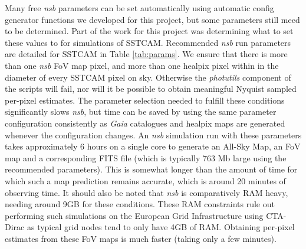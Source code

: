 Many free \textit{nsb} parameters can be set automatically using automatic config generator functions we developed for this project, but some parameters still meed to be determined. Part of the work for this project was determining what to set these values to for simulations of SSTCAM. Recommended \textit{nsb} run parameters are detailed for SSTCAM in Table \ref{tab:params}. We ensure that there is more than one \textit{nsb} FoV map pixel, and more than one healpix pixel within in the diameter of every SSTCAM pixel on sky. Otherwise the \textit{photutils} component of the scripts will fail, nor will it be possible to obtain meaningful Nyquist sampled per-pixel estimates. The parameter selection needed to fulfill these conditions significantly slows \textit{nsb}, but time can be saved by using the same parameter configuration consistently as \textit{Gaia} catalogues and healpix maps are generated whenever the configuration changes. An \textit{nsb} simulation run with these parameters takes approximately 6 hours on a single core to generate an All-Sky Map, an FoV map and a corresponding FITS file (which is typically 763 Mb large using the recommended parameters). This is somewhat longer than the amount of time for which such a map prediction remains accurate, which is around 20 minutes of observing time. It should also be noted that \textit{nsb} is comparatively RAM heavy, needing around 9GB for these conditions. These RAM constraints rule out performing such simulations on the European Grid Infrastructure using CTA-Dirac as typical grid nodes tend to only have 4GB of RAM. Obtaining per-pixel estimates from these FoV maps is much faster (taking only a few minutes).

